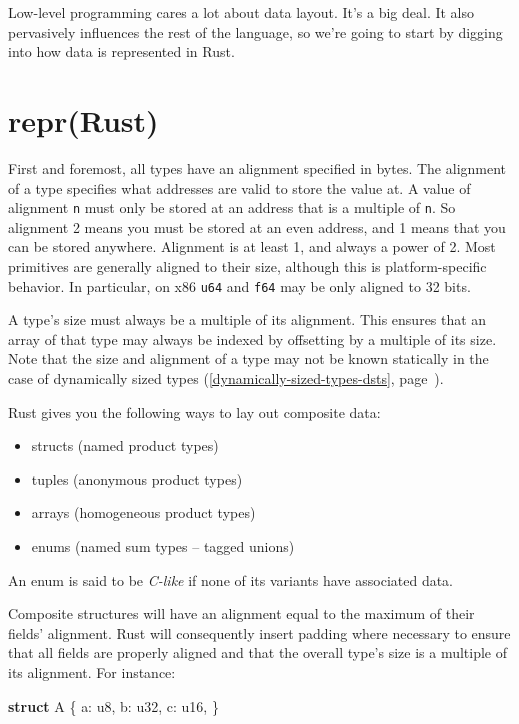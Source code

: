 \documentclass[a4paper,]{book}
\renewcommand*{\hyperlink}[2]{%
 #2 (\autoref{#1}, page~\pageref{#1})}
\newenvironment{Shaded}{\begin{snugshade}}{\end{snugshade}}
\newcommand{\KeywordTok}[1]{\textcolor[rgb]{0.13,0.29,0.53}{\textbf{{#1}}}}
\newcommand{\DataTypeTok}[1]{\textcolor[rgb]{0.13,0.29,0.53}{{#1}}}
\newcommand{\NormalTok}[1]{{#1}}
\providecommand{\tightlist}{%
  \setlength{\itemsep}{0pt}\setlength{\parskip}{0pt}}
\begin{document}
Low-level programming cares a lot about data layout. It's a big deal. It
also pervasively influences the rest of the language, so we're going to
start by digging into how data is represented in Rust.

\section{repr(Rust)}\label{sec--repr-rust}

First and foremost, all types have an alignment specified in bytes. The
alignment of a type specifies what addresses are valid to store the
value at. A value of alignment \texttt{n} must only be stored at an
address that is a multiple of \texttt{n}. So alignment 2 means you must
be stored at an even address, and 1 means that you can be stored
anywhere. Alignment is at least 1, and always a power of 2. Most
primitives are generally aligned to their size, although this is
platform-specific behavior. In particular, on x86 \texttt{u64} and
\texttt{f64} may be only aligned to 32 bits.

A type's size must always be a multiple of its alignment. This ensures
that an array of that type may always be indexed by offsetting by a
multiple of its size. Note that the size and alignment of a type may not
be known statically in the case of
\protect\hyperlink{dynamically-sized-types-dsts}{dynamically sized
types}.

Rust gives you the following ways to lay out composite data:

\begin{itemize}
\tightlist
\item
  structs (named product types)
\item
  tuples (anonymous product types)
\item
  arrays (homogeneous product types)
\item
  enums (named sum types -- tagged unions)
\end{itemize}

An enum is said to be \emph{C-like} if none of its variants have
associated data.

Composite structures will have an alignment equal to the maximum of
their fields' alignment. Rust will consequently insert padding where
necessary to ensure that all fields are properly aligned and that the
overall type's size is a multiple of its alignment. For instance:

\begin{Shaded}
\begin{Highlighting}[]
\KeywordTok{struct} \NormalTok{A \{}
    \NormalTok{a: }\DataTypeTok{u8}\NormalTok{,}
    \NormalTok{b: }\DataTypeTok{u32}\NormalTok{,}
    \NormalTok{c: }\DataTypeTok{u16}\NormalTok{,}
\NormalTok{\}}
\end{Highlighting}
\end{Shaded}
\end{document}
